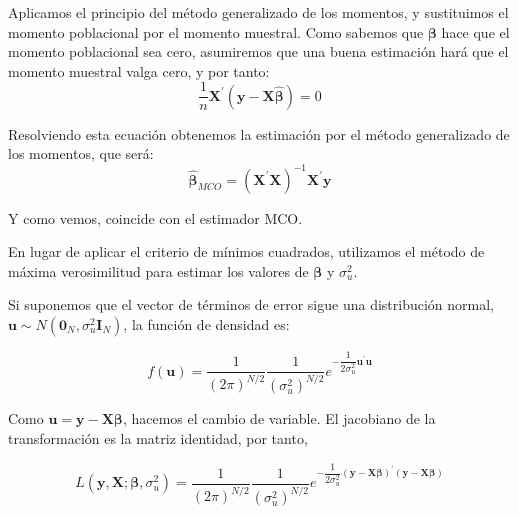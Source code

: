 Aplicamos el principio del m\'etodo generalizado de los momentos, y sustituimos el momento poblacional por el momento muestral. Como sabemos que $\boldsymbol{\beta}$ hace que el momento poblacional sea cero, asumiremos que una buena estimaci\'on har\'a que el momento muestral valga cero, y por tanto:
\begin{equation*}
\dfrac{1}{n}\boldsymbol{X}^{\prime}(\boldsymbol{y}-\boldsymbol{X}\hat{\boldsymbol{\beta}})=0
\end{equation*}

Resolviendo esta ecuaci\'on obtenemos la estimaci\'on por el m\'etodo generalizado de los momentos, que ser\'a:
\begin{equation*}
\hat{\boldsymbol{\beta}}_{MCO}=\left(\boldsymbol{X}^{\prime}\boldsymbol{X}\right)^{-1}\boldsymbol{X}^{\prime}\boldsymbol{y}
\end{equation*}

Y como vemos, coincide con el estimador MCO.



En lugar de aplicar el criterio de m\'inimos cuadrados, utilizamos el
m\'etodo de m\'axima verosimilitud para estimar los valores de $\boldsymbol{\beta}$
y $\sigma_{u}^{2}$.

Si suponemos que el vector de t\'erminos de error sigue una distribuci\'on
normal, $\boldsymbol{u}\sim N\left(\boldsymbol{0}_{N},\sigma_{u}^{2}\boldsymbol{I}_{N}\right)$,
la funci\'on de densidad es: 

\begin{equation*}
f\left(\boldsymbol{u}\right)=\dfrac{1}{\left(2\pi\right)^{N/2}}\dfrac{1}{\left(\sigma_{u}^{2}\right)^{N/2}}e^{-\dfrac{1}{2\sigma_{u}^{2}}\boldsymbol{u}^{\prime}\boldsymbol{u}}
\end{equation*}


Como $\boldsymbol{u}=\boldsymbol{y}-\boldsymbol{X}\boldsymbol{\beta}$,
hacemos el cambio de variable. El jacobiano de la transformaci\'on es
la matriz identidad, por tanto,

\begin{equation*}
L\left(\boldsymbol{y},\boldsymbol{X};\boldsymbol{\beta},\sigma_{u}^{2}\right)=\dfrac{1}{\left(2\pi\right)^{N/2}}\dfrac{1}{\left(\sigma_{u}^{2}\right)^{N/2}}e^{-\dfrac{1}{2\sigma_{u}^{2}}\left(\boldsymbol{y}-\boldsymbol{X}\boldsymbol{\beta}\right)^{\prime}\left(\boldsymbol{y}-\boldsymbol{X}\boldsymbol{\beta}\right)}
\end{equation*}


